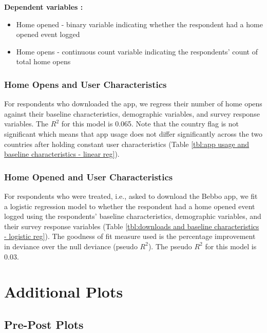 \documentclass{article}
\begin{document}
\textbf{Dependent variables :}
\begin{itemize}
    \item Home opened - binary variable indicating whether the respondent had a home opened event logged
    \item Home opens - continuous count variable indicating the respondents' count of total home opens
\end{itemize}


\subsubsection*{Home Opens and User Characteristics}
For respondents who downloaded the app, we regress their number of home opens against their baseline characteristics, demographic variables, and survey response variables. The $R^{2}$ for this model is 0.065. Note that the country flag is not significant which means that app usage does not differ significantly across the two countries after holding constant user characteristics (Table \ref{tbl:app usage and baseline characteristics - linear reg}).


\subsubsection*{Home Opened and User Characteristics}
For respondents who were treated, i.e., asked to download the Bebbo app, we fit a logistic regression model to whether the respondent had a home opened event logged using the respondents' baseline characteristics, demographic variables, and their survey response variables (Table \ref{tbl:downloads and baseline characteristics - logistic reg}). The goodness of fit measure used is the percentage improvement in deviance over the null deviance (pseudo $R^{2}$). The pseudo $R^{2}$ for this model is 0.03.



\printbibliography

\appendix


\section{Additional Plots}

\subsection*{Pre-Post Plots}
\end{document}
